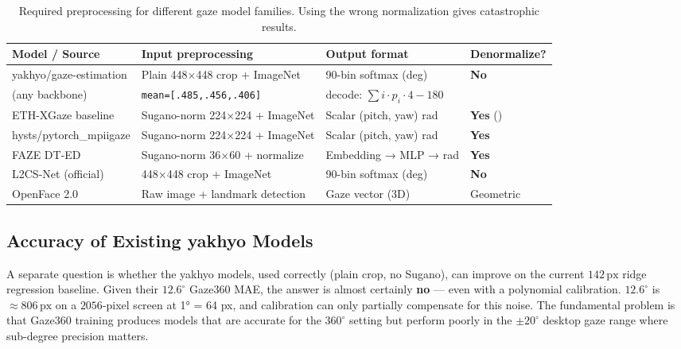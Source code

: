 \documentclass[11pt,a4paper]{article}
\begin{document}
\begin{table}[H]
  \centering
  \caption{Required preprocessing for different gaze model families. Using the wrong normalization gives catastrophic results.}
  \small
  \begin{tabular}{llll}
    \toprule
    \textbf{Model / Source} & \textbf{Input preprocessing} & \textbf{Output format} & \textbf{Denormalize?} \\
    \midrule
    yakhyo/gaze-estimation & Plain 448×448 crop + ImageNet & 90-bin softmax (deg) & \textbf{No} \\
    \quad (any backbone) & \texttt{mean=[.485,.456,.406]} & decode: $\sum i\cdot p_i \cdot 4 - 180$ & \\
    \midrule
    ETH-XGaze baseline~\cite{zhang2020ethxgaze} & Sugano-norm 224×224 + ImageNet & Scalar (pitch, yaw) rad & \textbf{Yes} (\cite{zhang2018revisiting}) \\
    hysts/pytorch\_mpiigaze & Sugano-norm 224×224 + ImageNet & Scalar (pitch, yaw) rad & \textbf{Yes} \\
    \midrule
    FAZE DT-ED~\cite{park2019faze} & Sugano-norm 36×60 + normalize & Embedding → MLP → rad & \textbf{Yes} \\
    \midrule
    L2CS-Net (official)~\cite{abdelrahman2022l2cs} & 448×448 crop + ImageNet & 90-bin softmax (deg) & \textbf{No} \\
    \midrule
    OpenFace 2.0~\cite{baltrusaitis2018openface} & Raw image + landmark detection & Gaze vector (3D) & Geometric \\
    \bottomrule
  \end{tabular}
  \label{tab:compat}
\end{table}

\subsection{Accuracy of Existing yakhyo Models}

A separate question is whether the yakhyo models, used correctly (plain crop, no Sugano), can improve on the current $142\,\text{px}$ ridge regression baseline.
Given their $12.6^\circ$ Gaze360 MAE, the answer is almost certainly \textbf{no} --- even with a polynomial calibration.
$12.6^\circ$ is $\approx 806\,\text{px}$ on a $2056$-pixel screen at 1° = 64 px, and calibration can only partially compensate for this noise.
The fundamental problem is that Gaze360 training produces models that are accurate for the $360^\circ$ setting but perform poorly in the $\pm20^\circ$ desktop gaze range where sub-degree precision matters.
\end{document}
